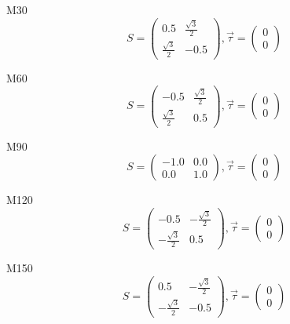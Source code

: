 \documentclass[12pt, fleqn]{article}
\begin{document}
M30
\begin{equation}
    S=
    \begin{pmatrix}
        0.5&\frac{\sqrt{3}}{2}\\
        \frac{\sqrt{3}}{2}&-0.5
    \end{pmatrix}
    ,\vec{\tau}=
    \begin{pmatrix}
        0\\
        0
    \end{pmatrix}
    \label{M30}
\end{equation}

M60
\begin{equation}
    S=
    \begin{pmatrix}
        -0.5&\frac{\sqrt{3}}{2}\\
        \frac{\sqrt{3}}{2}&0.5
    \end{pmatrix}
    ,\vec{\tau}=
    \begin{pmatrix}
        0\\
        0
    \end{pmatrix}
    \label{M60}
\end{equation}

M90
\begin{equation}
    S=
    \begin{pmatrix}
        -1.0&0.0\\
        0.0&1.0
    \end{pmatrix}
    ,\vec{\tau}=
    \begin{pmatrix}
        0\\
        0
    \end{pmatrix}
    \label{M90}
\end{equation}

M120
\begin{equation}
    S=
    \begin{pmatrix}
        -0.5&-\frac{\sqrt{3}}{2}\\
        -\frac{\sqrt{3}}{2}&0.5
    \end{pmatrix}
    ,\vec{\tau}=
    \begin{pmatrix}
        0\\
        0
    \end{pmatrix}
    \label{M120}
\end{equation}

M150
\begin{equation}
    S=
    \begin{pmatrix}
        0.5&-\frac{\sqrt{3}}{2}\\
        -\frac{\sqrt{3}}{2}&-0.5
    \end{pmatrix}
    ,\vec{\tau}=
    \begin{pmatrix}
        0\\
        0
    \end{pmatrix}
    \label{M150}
\end{equation}
\end{document}
